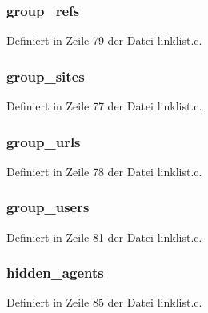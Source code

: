\subsubsection{ {\bf group\_\-refs}}\label{linklist_8h_73820e36830211218e9c911bc6ea6273}




Definiert in Zeile 79 der Datei linklist.c.
\subsubsection{ {\bf group\_\-sites}}\label{linklist_8h_cda3597076ed2d11c457ee98bb89caa7}




Definiert in Zeile 77 der Datei linklist.c.
\subsubsection{ {\bf group\_\-urls}}\label{linklist_8h_2b91bf4fd34380ee9673b57513dbff01}




Definiert in Zeile 78 der Datei linklist.c.
\subsubsection{ {\bf group\_\-users}}\label{linklist_8h_5589f953a1673e7a2f3891d321794340}




Definiert in Zeile 81 der Datei linklist.c.
\subsubsection{ {\bf hidden\_\-agents}}\label{linklist_8h_89feb23799329906fbd4a3d47a303027}




Definiert in Zeile 85 der Datei linklist.c.

